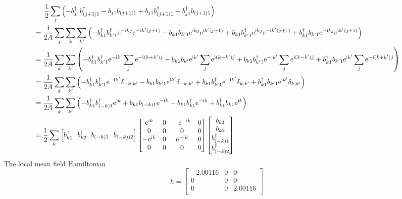 \documentclass[letter]{article}
\newcommand{\e}{\mathrm{e}}
\newcommand{\ii}{\mathrm{i}}
\begin{document}
  $$
\begin{aligned}
  & \indent  \frac{1}{2}\sum_{j}\left(-b_{j1}^{\dagger}b_{(j+1)1}^{\dagger}-b_{j1}b_{(j+1)1}+b_{j1}b_{(j+1)1}^{\dagger}+b_{j1}^{\dagger}b_{(j+1)1}\right)\\
  &=\frac{1}{2A}\sum_{j}\sum_{k}\sum_{k'}\left(-b_{k1}^{\dagger}b_{k'1}^{\dagger}\e^{-\ii kj}\e^{-\ii k'(j+1)}-b_{k1}b_{k'1}\e^{\ii kj}\e^{\ii k'(j+1)}+b_{k1}b_{k'1}^{\dagger}\e^{\ii kj}\e^{-\ii k'(j+1)}+b_{k1}^{\dagger}b_{k'1}\e^{-\ii kj}\e^{\ii k'(j+1)}\right)\\
  &=\frac{1}{2A}\sum_{k}\sum_{k'}\left(-b_{k1}^{\dagger}b_{k'1}^{\dagger}\e^{-\ii k'}\sum_j \e^{-\ii (k+k')j}-b_{k1}b_{k'}\e^{\ii k'}\sum_j \e^{\ii (k+k')j}+b_{k1}b_{k'1}^{\dagger}\e^{-\ii k'}\sum_j \e^{\ii (k-k')j}+b_{k1}^{\dagger}b_{k'1}\e^{\ii k'}\sum_j \e^{-\ii (k+k')j}\right)\\
  &=\frac{1}{2A}\sum_k\sum_{k'}\left(-b_{k1}^{\dagger}b_{k'1}^{\dagger}\e^{-\ii k'}\delta_{-k,k'}-b_{k1}b_{k'1}\e^{\ii k'}\delta_{-k,k'}+b_{k1}b_{k'1}^{\dagger}\e^{-\ii k'}\delta_{k,k'}+b_{k1}^{\dagger}b_{k'1}\e^{\ii k'}\delta_{k,k'}\right)\\
  &=\frac{1}{2A}\sum_k\sum_{k'}\left(-b_{k1}^{\dagger}b_{(-k)1}^{\dagger}\e^{\ii k}+b_{k1}b_{(-k)1}\e^{-\ii k}-b_{k1}b_{k1}^{\dagger}\e^{-\ii k}+b_{k1}^{\dagger}b_{k1}\e^{\ii k}\right)\\
  &=\frac{1}{2}\sum_k \left[
    b_{k1}^{\dagger} \ \ 
    b_{k2}^{\dagger}\  \ 
    b_{(-k)1}\ \ 
    b_{(-k))2}\right]
   \begin{bmatrix}
        \e^{\ii k} & 0 & -\e^{-\ii k} & 0 \\
       0 &  0 & 0 &0 \\
       -\e^{\ii k} &  0 & \e^{-\ii k} &0\\
        0 & 0 & 0& 0
        \end{bmatrix}\begin{bmatrix}
            b_{k1}  \\
            b_{k2}  \\
            b_{(-k)1}^{\dagger}\\
            b_{(-k)2}^{\dagger}
            \end{bmatrix}
\end{aligned}
$$
The local mean field Hamiltonian $$
h=\begin{bmatrix}
    -2.00116 & 0 & 0 \\
   0 &  0 & 0  \\
  0 &  0 & 2.00116 \\
    \end{bmatrix}
$$
\end{document}
